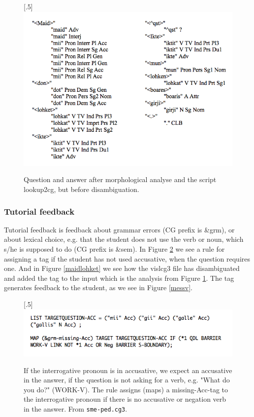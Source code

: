 \documentclass[a4paper,12pt]{article}
\begin{document}
\begin{figure}[htbp]
\begin{center}
\scalebox{.5}[.5]{\includegraphics{presentation/img/iktelohken2.png}}
\caption{Question and answer after morphological analyse and the script lookup2cg, but before disambiguation.}
\label{iktelohken}
\end{center}
\end{figure}

\subsubsection{Tutorial feedback}
Tutorial feedback is feedback about grammar errors (CG prefix is \&grm), or about lexical choice, e.g. that the student does not use the verb or noun, which s/he is supposed to do (CG prefix is \&sem). In Figure \ref{cg3} we see a rule for assigning a tag if the student has not used accusative, when the question requires one. And in Figure \ref{maidlohket} we see how the vislcg3 file has disambiguated and added the tag to the input which is the analysis from Figure \ref{iktelohken}. The tag generates feedback to the student, as we see in Figure \ref{messv}.

\begin{figure}[htbp]
\begin{center}
\scalebox{.5}[.5]{\includegraphics{presentation/img/pedcg3.png}}
\caption{If the interrogative pronoun is in accusative, we expect an accusative in the answer, if the question is not asking for a verb, e.g. "What do you do?" (WORK-V). The rule assigns (maps) a missing-Acc-tag to the interrogative pronoun if there is no accusative or negation verb in the answer. From \texttt{sme-ped.cg3}.}
\label{cg3}
\end{center}
\end{figure}
\end{document}
